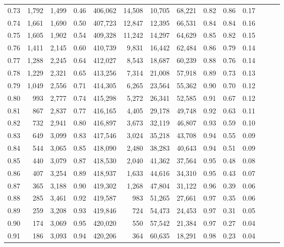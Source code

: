 \begin{tabular}{rrrrrrrrrrrrrr}
0.73 &  1,792 &  1,499 &  0.46 &  406,062 &   14,508 &  10,705 &  68,221 &  0.82 &  0.86 &      0.17 \\
0.74 &  1,661 &  1,690 &  0.50 &  407,723 &   12,847 &  12,395 &  66,531 &  0.84 &  0.84 &      0.16 \\
0.75 &  1,605 &  1,902 &  0.54 &  409,328 &   11,242 &  14,297 &  64,629 &  0.85 &  0.82 &      0.15 \\
0.76 &  1,411 &  2,145 &  0.60 &  410,739 &    9,831 &  16,442 &  62,484 &  0.86 &  0.79 &      0.14 \\
0.77 &  1,288 &  2,245 &  0.64 &  412,027 &    8,543 &  18,687 &  60,239 &  0.88 &  0.76 &      0.14 \\
0.78 &  1,229 &  2,321 &  0.65 &  413,256 &    7,314 &  21,008 &  57,918 &  0.89 &  0.73 &      0.13 \\
0.79 &  1,049 &  2,556 &  0.71 &  414,305 &    6,265 &  23,564 &  55,362 &  0.90 &  0.70 &      0.12 \\
0.80 &    993 &  2,777 &  0.74 &  415,298 &    5,272 &  26,341 &  52,585 &  0.91 &  0.67 &      0.12 \\
0.81 &    867 &  2,837 &  0.77 &  416,165 &    4,405 &  29,178 &  49,748 &  0.92 &  0.63 &      0.11 \\
0.82 &    732 &  2,941 &  0.80 &  416,897 &    3,673 &  32,119 &  46,807 &  0.93 &  0.59 &      0.10 \\
0.83 &    649 &  3,099 &  0.83 &  417,546 &    3,024 &  35,218 &  43,708 &  0.94 &  0.55 &      0.09 \\
0.84 &    544 &  3,065 &  0.85 &  418,090 &    2,480 &  38,283 &  40,643 &  0.94 &  0.51 &      0.09 \\
0.85 &    440 &  3,079 &  0.87 &  418,530 &    2,040 &  41,362 &  37,564 &  0.95 &  0.48 &      0.08 \\
0.86 &    407 &  3,254 &  0.89 &  418,937 &    1,633 &  44,616 &  34,310 &  0.95 &  0.43 &      0.07 \\
0.87 &    365 &  3,188 &  0.90 &  419,302 &    1,268 &  47,804 &  31,122 &  0.96 &  0.39 &      0.06 \\
0.88 &    285 &  3,461 &  0.92 &  419,587 &      983 &  51,265 &  27,661 &  0.97 &  0.35 &      0.06 \\
0.89 &    259 &  3,208 &  0.93 &  419,846 &      724 &  54,473 &  24,453 &  0.97 &  0.31 &      0.05 \\
0.90 &    174 &  3,069 &  0.95 &  420,020 &      550 &  57,542 &  21,384 &  0.97 &  0.27 &      0.04 \\
0.91 &    186 &  3,093 &  0.94 &  420,206 &      364 &  60,635 &  18,291 &  0.98 &  0.23 &      0.04 \\

\end{tabular}
